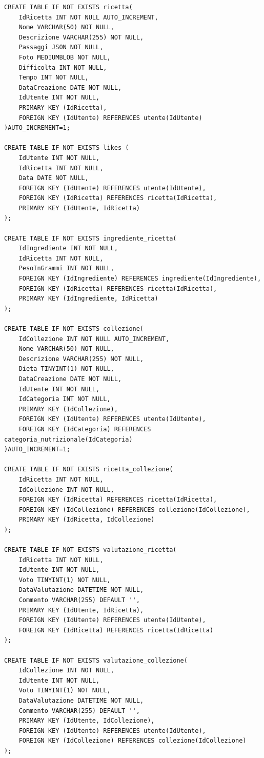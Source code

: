 ﻿\documentclass[a4paper,12pt]{report}
\begin{document}
\begin{verbatim}
CREATE TABLE IF NOT EXISTS ricetta(
    IdRicetta INT NOT NULL AUTO_INCREMENT,
    Nome VARCHAR(50) NOT NULL,
    Descrizione VARCHAR(255) NOT NULL,
    Passaggi JSON NOT NULL,
    Foto MEDIUMBLOB NOT NULL,
    Difficolta INT NOT NULL,
    Tempo INT NOT NULL,
    DataCreazione DATE NOT NULL,
    IdUtente INT NOT NULL,
    PRIMARY KEY (IdRicetta),
    FOREIGN KEY (IdUtente) REFERENCES utente(IdUtente)
)AUTO_INCREMENT=1;

CREATE TABLE IF NOT EXISTS likes (
    IdUtente INT NOT NULL,
    IdRicetta INT NOT NULL,
    Data DATE NOT NULL,
    FOREIGN KEY (IdUtente) REFERENCES utente(IdUtente),
    FOREIGN KEY (IdRicetta) REFERENCES ricetta(IdRicetta),
    PRIMARY KEY (IdUtente, IdRicetta)
);

CREATE TABLE IF NOT EXISTS ingrediente_ricetta(
    IdIngrediente INT NOT NULL,
    IdRicetta INT NOT NULL,
    PesoInGrammi INT NOT NULL,
    FOREIGN KEY (IdIngrediente) REFERENCES ingrediente(IdIngrediente),
    FOREIGN KEY (IdRicetta) REFERENCES ricetta(IdRicetta),
    PRIMARY KEY (IdIngrediente, IdRicetta)
);

CREATE TABLE IF NOT EXISTS collezione(
    IdCollezione INT NOT NULL AUTO_INCREMENT,
    Nome VARCHAR(50) NOT NULL,
    Descrizione VARCHAR(255) NOT NULL,
    Dieta TINYINT(1) NOT NULL,
    DataCreazione DATE NOT NULL,
    IdUtente INT NOT NULL,
    IdCategoria INT NOT NULL,
    PRIMARY KEY (IdCollezione),
    FOREIGN KEY (IdUtente) REFERENCES utente(IdUtente),
    FOREIGN KEY (IdCategoria) REFERENCES categoria_nutrizionale(IdCategoria)
)AUTO_INCREMENT=1;

CREATE TABLE IF NOT EXISTS ricetta_collezione(
    IdRicetta INT NOT NULL,
    IdCollezione INT NOT NULL,
    FOREIGN KEY (IdRicetta) REFERENCES ricetta(IdRicetta),
    FOREIGN KEY (IdCollezione) REFERENCES collezione(IdCollezione),
    PRIMARY KEY (IdRicetta, IdCollezione)
);

CREATE TABLE IF NOT EXISTS valutazione_ricetta(
    IdRicetta INT NOT NULL,
    IdUtente INT NOT NULL,
    Voto TINYINT(1) NOT NULL,
    DataValutazione DATETIME NOT NULL,
    Commento VARCHAR(255) DEFAULT '',
    PRIMARY KEY (IdUtente, IdRicetta),
    FOREIGN KEY (IdUtente) REFERENCES utente(IdUtente),
    FOREIGN KEY (IdRicetta) REFERENCES ricetta(IdRicetta)
);

CREATE TABLE IF NOT EXISTS valutazione_collezione(
    IdCollezione INT NOT NULL,
    IdUtente INT NOT NULL,
    Voto TINYINT(1) NOT NULL,
    DataValutazione DATETIME NOT NULL,
    Commento VARCHAR(255) DEFAULT '',
    PRIMARY KEY (IdUtente, IdCollezione),
    FOREIGN KEY (IdUtente) REFERENCES utente(IdUtente),
    FOREIGN KEY (IdCollezione) REFERENCES collezione(IdCollezione)
);


\end{verbatim}
\end{document}

